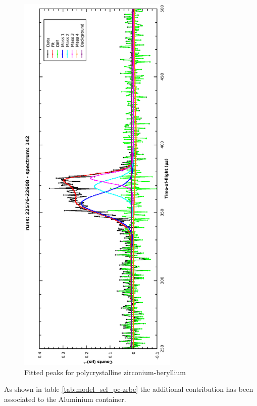 \documentclass[a4paper]{article}
\begin{document}
\begin{figure}[h!]
  \centering
  \vspace{-60pt}
  \begin{turn}{-90}
    \includegraphics[width=0.68\textwidth]{graphics/model_sel_pc-zrbe.eps}
  \end{turn}
  \vspace{-60pt}
  \caption{Fitted peaks for polycrystalline zirconium-beryllium}
  \label{fig:model_sel_pc-zrbe}
\end{figure}
\FloatBarrier

As shown in table \ref{tab:model_sel_pc-zrbe} the additional contribution has
been associated to the Aluminium container.
\end{document}
